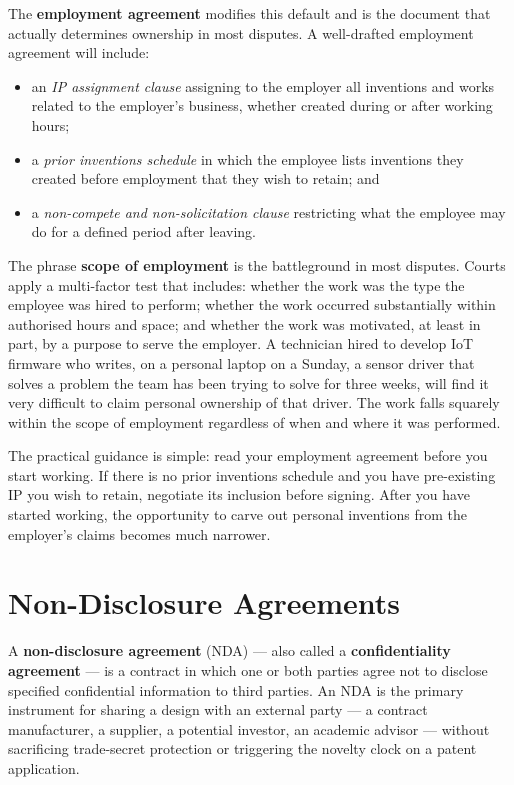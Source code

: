 The \textbf{employment agreement} modifies
this default and is the document that actually determines ownership in most
disputes.
A well-drafted employment agreement will include:
\begin{itemize}
  \item an \emph{IP assignment clause} assigning to the employer all inventions
        and works related to the employer's business, whether created during or
        after working hours;
  \item a \emph{prior inventions schedule} in which the employee lists inventions
        they created before employment that they wish to retain; and
  \item a \emph{non-compete and non-solicitation clause} restricting what the
        employee may do for a defined period after leaving.
\end{itemize}

The phrase \textbf{scope of employment} is the
battleground in most disputes.
Courts apply a multi-factor test that includes: whether the work was the type the
employee was hired to perform; whether the work occurred substantially within
authorised hours and space; and whether the work was motivated, at least in part,
by a purpose to serve the employer.
A technician hired to develop IoT firmware who writes, on a personal laptop on a
Sunday, a sensor driver that solves a problem the team has been trying to solve for
three weeks, will find it very difficult to claim personal ownership of that driver.
The work falls squarely within the scope of employment regardless of when and where
it was performed.

The practical guidance is simple: read your employment agreement before you start
working.
If there is no prior inventions schedule and you have pre-existing IP you wish to
retain, negotiate its inclusion before signing.
After you have started working, the opportunity to carve out personal inventions
from the employer's claims becomes much narrower.

\section{Non-Disclosure Agreements}
\label{sec:ch15-nda}

A \textbf{non-disclosure agreement}
(NDA) --- also called a \textbf{confidentiality agreement} --- is a contract in which one or both parties agree not to disclose
specified confidential information to third parties.
An NDA is the primary instrument for sharing a design with an external party ---
a contract manufacturer, a supplier, a potential investor, an academic advisor ---
without sacrificing trade-secret protection or triggering the novelty clock on a
patent application.

